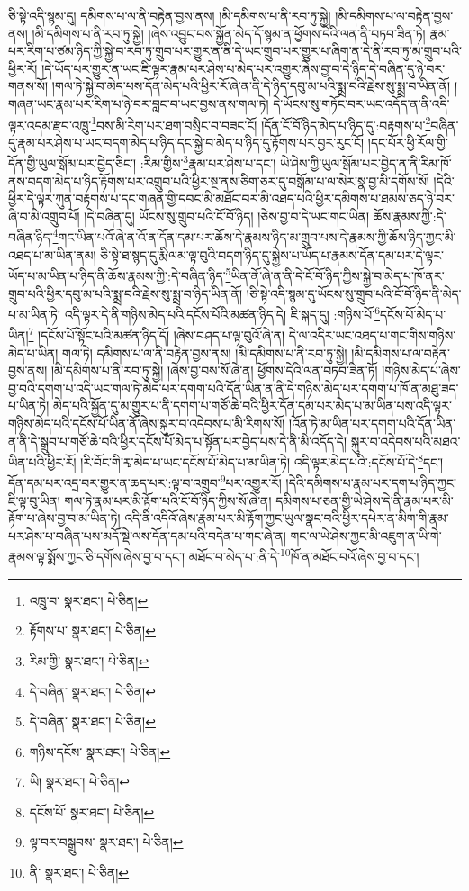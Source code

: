 ཅི་སྟེ་འདི་སྙམ་དུ། དམིགས་པ་ལ་ནི་བརྟེན་བྱས་ནས། །མི་དམིགས་པ་ནི་རབ་ཏུ་སྐྱེ། །མི་དམིགས་པ་ལ་བརྟེན་བྱས་ནས། །མི་དམིགས་པ་ནི་རབ་ཏུ་སྐྱེ། །ཞེས་འབྱུང་བས་སྐྱོན་མེད་དོ་སྙམ་ན་ཕྱོགས་དེའི་ལན་ནི་བཏབ་ཟིན་ཏེ། རྣམ་པར་རིག་པ་ཙམ་ཉིད་ཀྱི་སྐྱེ་བ་རབ་ཏུ་གྲུབ་པར་གྱུར་ན་ནི་དེ་ཡང་གྲུབ་པར་གྱུར་པ་ཞིག་ན་དེ་ནི་རབ་ཏུ་མ་གྲུབ་པའི་ཕྱིར་རོ། །དེ་ཡོད་པར་གྱུར་ན་ཡང་ཇི་ལྟར་རྣམ་པར་ཤེས་པ་མེད་པར་འགྱུར་ཞེས་བྱ་བ་དེ་ཉིད་དེ་བཞིན་དུ་ཉེ་བར་གནས་སོ། །གལ་ཏེ་སྐྱེ་བ་མེད་པས་དོན་མེད་པའི་ཕྱིར་རོ་ཞེ་ན་ནི་དེ་ཉིད་དབུ་མ་པའི་སྨྲ་བའི་རྗེས་སུ་སྨྲ་བ་ཡིན་ནོ། །གཞན་ཡང་རྣམ་པར་རིག་པ་ཉེ་བར་བླང་བ་ཡང་བྱས་ནས་གལ་ཏེ། དེ་ཡོངས་སུ་གཏོང་བར་ཡང་འདོད་ན་ནི་འདི་ལྟར་འདམ་རྫབ་འཁྲུ་\footnote{འཁྲུ་བ་  སྣར་ཐང་།  པེ་ཅིན། }བས་མི་རེག་པར་ཐག་བསྲིང་བ་བཟང་ངོ། །དོན་ངོ་བོ་ཉིད་མེད་པ་ཉིད་དུ་:བརྟགས་པ་\footnote{རྟོགས་པ་  སྣར་ཐང་།  པེ་ཅིན། }བཞིན་དུ་རྣམ་པར་ཤེས་པ་ཡང་བདག་མེད་པ་ཉིད་དང་སྐྱེ་བ་མེད་པ་ཉིད་དུ་རྟོགས་པར་བྱར་རུང་ངོ། །དང་པོར་ཕྱི་རོལ་གྱི་དོན་གྱི་ཡུལ་སྒོམ་པར་བྱེད་ཅིང་། :རིམ་གྱིས་\footnote{རིམ་གྱི་  སྣར་ཐང་།  པེ་ཅིན། }རྣམ་པར་ཤེས་པ་དང་། ཡེ་ཤེས་ཀྱི་ཡུལ་སྒོམ་པར་བྱེད་ན་ནི་རིམ་ཁོ་ནས་བདག་མེད་པ་ཉིད་རྟོགས་པར་འགྲུབ་པའི་ཕྱིར་སྔ་ནས་ཅིག་ཅར་དུ་བསྒོམ་པ་ལ་སེར་སྣ་བྱ་མི་དགོས་སོ། །དེའི་ཕྱིར་དེ་ལྟར་ཀུན་བརྟགས་པ་དང་གཞན་གྱི་དབང་མི་མཐོང་བར་མི་འཐད་པའི་ཕྱིར་དམིགས་པ་ཐམས་ཅད་ཉེ་བར་ཞི་བ་མི་འགྲུབ་པོ། །དེ་བཞིན་དུ། ཡོངས་སུ་གྲུབ་པའི་ངོ་བོ་ཉིད། །ཅེས་བྱ་བ་དེ་ཡང་གང་ཡིན། ཆོས་རྣམས་ཀྱི་:དེ་བཞིན་ཉིད་\footnote{དེ་བཞིན་  སྣར་ཐང་།  པེ་ཅིན། }གང་ཡིན་པའོ་ཞེ་ན་འོ་ན་དོན་དམ་པར་ཆོས་དེ་རྣམས་ཉིད་མ་གྲུབ་པས་དེ་རྣམས་ཀྱི་ཆོས་ཉིད་ཀྱང་མི་འཐད་པ་མ་ཡིན་ནམ། ཅི་སྟེ་ཐ་སྙད་དུ་རྨི་ལམ་ལྟ་བུའི་བདག་ཉིད་དུ་སྐྱེས་པ་ཡོད་པ་རྣམས་དོན་དམ་པར་དེ་ལྟར་ཡོད་པ་མ་ཡིན་པ་ཉིད་ནི་ཆོས་རྣམས་ཀྱི་:དེ་བཞིན་ཉིད་\footnote{དེ་བཞིན་  སྣར་ཐང་།  པེ་ཅིན། }ཡིན་ནོ་ཞེ་ན་ནི་དེ་ངོ་བོ་ཉིད་ཀྱིས་སྐྱེ་བ་མེད་པ་ཁོ་ནར་གྲུབ་པའི་ཕྱིར་དབུ་མ་པའི་སྨྲ་བའི་རྗེས་སུ་སྨྲ་བ་ཉིད་ཡིན་ནོ། །ཅི་སྟེ་འདི་སྙམ་དུ་ཡོངས་སུ་གྲུབ་པའི་ངོ་བོ་ཉིད་ནི་མེད་པ་མ་ཡིན་ཏེ། འདི་ལྟར་དེ་ནི་གཉིས་མེད་པའི་དངོས་པོའི་མཚན་ཉིད་དེ། ཇི་སྐད་དུ། :གཉིས་པོ་\footnote{གཉིས་དངོས་  སྣར་ཐང་།  པེ་ཅིན། }དངོས་པོ་མེད་པ་ཡིན།\footnote{ཡི།  སྣར་ཐང་།  པེ་ཅིན། } །དངོས་པོ་སྟོང་པའི་མཚན་ཉིད་དོ། །ཞེས་བཤད་པ་ལྟ་བུའོ་ཞེ་ན། དེ་ལ་འདིར་ཡང་འཐད་པ་གང་གིས་གཉིས་མེད་པ་ཡིན། གལ་ཏེ། དམིགས་པ་ལ་ནི་བརྟེན་བྱས་ནས། །མི་དམིགས་པ་ནི་རབ་ཏུ་སྐྱེ། །མི་དམིགས་པ་ལ་བརྟེན་བྱས་ནས། །མི་དམིགས་པ་ནི་རབ་ཏུ་སྐྱེ། །ཞེས་བྱ་བས་སོ་ཞེ་ན། ཕྱོགས་དེའི་ལན་བཏབ་ཟིན་ཏོ། །གཉིས་མེད་པ་ཞེས་བྱ་བའི་དགག་པ་འདི་ཡང་གལ་ཏེ་མེད་པར་དགག་པའི་དོན་ཡིན་ན་ནི་དེ་གཉིས་མེད་པར་དགག་པ་ཁོ་ན་མཐུ་ཟད་པ་ཡིན་ཏེ། མེད་པའི་སྐྱོན་དུ་མ་གྱུར་པ་ནི་དགག་པ་གཙོ་ཆེ་བའི་ཕྱིར་དོན་དམ་པར་མེད་པ་མ་ཡིན་པས་འདི་ལྟར་གཉིས་མེད་པའི་དངོས་པོ་ཡིན་ནོ་ཞེས་སྐུར་བ་འདེབས་པ་མི་རིགས་སོ། །འོན་ཏེ་མ་ཡིན་པར་དགག་པའི་དོན་ཡིན་ན་ནི་དེ་སྒྲུབ་པ་གཙོ་ཆེ་བའི་ཕྱིར་དངོས་པོ་མེད་པ་སྟོན་པར་བྱེད་པས་དེ་ནི་མི་འདོད་དེ། སྐུར་བ་འདེབས་པའི་མཐའ་ཡིན་པའི་ཕྱིར་རོ། །རི་བོང་གི་རྭ་མེད་པ་ཡང་དངོས་པོ་མེད་པ་མ་ཡིན་ཏེ། འདི་ལྟར་མེད་པའི་:དངོས་པོ་དེ་\footnote{དངོས་པོ་  སྣར་ཐང་།  པེ་ཅིན། }དང་། དོན་དམ་པར་འདྲ་བར་གྱུར་ན་ཆད་པར་:ལྟ་བ་འགྲུབ་\footnote{ལྟ་བར་བསྒྲུབས་  སྣར་ཐང་།  པེ་ཅིན། }པར་འགྱུར་རོ། །དེའི་དམིགས་པ་རྣམ་པར་དག་པ་ཉིད་ཀྱང་ཇི་ལྟ་བུ་ཡིན། གལ་ཏེ་རྣམ་པར་མི་རྟོག་པའི་ངོ་བོ་ཉིད་ཀྱིས་སོ་ཞེ་ན། དམིགས་པ་ཅན་གྱི་ཡེ་ཤེས་དེ་ནི་རྣམ་པར་མི་རྟོག་པ་ཞེས་བྱ་བ་མ་ཡིན་ཏེ། འདི་ནི་འདིའོ་ཞེས་རྣམ་པར་མི་རྟོག་ཀྱང་ཡུལ་སྣང་བའི་ཕྱིར་དཔེར་ན་མིག་གི་རྣམ་པར་ཤེས་པ་བཞིན་པས་མདོ་སྡེ་ལས་དོན་དམ་པའི་བདེན་པ་གང་ཞེ་ན། གང་ལ་ཡེ་ཤེས་ཀྱང་མི་འཇུག་ན་ཡི་གེ་རྣམས་ལྟ་སྨོས་ཀྱང་ཅི་དགོས་ཞེས་བྱ་བ་དང་། མཐོང་བ་མེད་པ་:ནི་དེ་\footnote{ནི་  སྣར་ཐང་།  པེ་ཅིན། }ཁོ་ན་མཐོང་བའོ་ཞེས་བྱ་བ་དང་། 